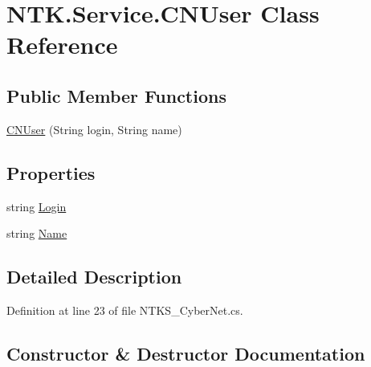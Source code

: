 \hypertarget{class_n_t_k_1_1_service_1_1_c_n_user}{}\section{N\+T\+K.\+Service.\+C\+N\+User Class Reference}
\label{class_n_t_k_1_1_service_1_1_c_n_user}
\subsection*{Public Member Functions}
\begin{DoxyCompactItemize}
\item 
\mbox{\hyperlink{class_n_t_k_1_1_service_1_1_c_n_user_a0dff558f82f595134cfac20002d34152}{C\+N\+User}} (String login, String name)
\end{DoxyCompactItemize}
\subsection*{Properties}
\begin{DoxyCompactItemize}
\item 
string \mbox{\hyperlink{class_n_t_k_1_1_service_1_1_c_n_user_a760f6785eec52a7d11d52e88e62bde14}{Login}}
\item 
string \mbox{\hyperlink{class_n_t_k_1_1_service_1_1_c_n_user_a27ac1c6fc205a74d38937ed74744fd5d}{Name}}
\end{DoxyCompactItemize}


\subsection{Detailed Description}


Definition at line 23 of file N\+T\+K\+S\+\_\+\+Cyber\+Net.\+cs.



\subsection{Constructor \& Destructor Documentation}
\mbox{\label{class_n_t_k_1_1_service_1_1_c_n_user_a0dff558f82f595134cfac20002d34152}} 
